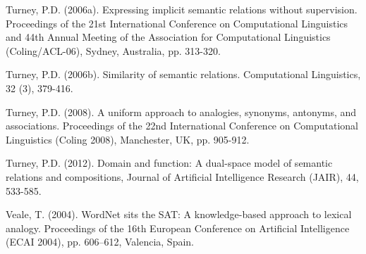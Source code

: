 \documentclass[11pt]{article}
\begin{document}
Turney, P.D. (2006a). Expressing implicit semantic relations without supervision. Proceedings of the 21st International Conference on Computational Linguistics and 44th Annual Meeting of the Association for Computational Linguistics (Coling/ACL-06), Sydney, Australia, pp. 313-320.

Turney, P.D. (2006b). Similarity of semantic relations. Computational Linguistics, 32 (3), 379-416.

Turney, P.D. (2008). A uniform approach to analogies, synonyms, antonyms, and associations. Proceedings of the 22nd International Conference on Computational Linguistics (Coling 2008), Manchester, UK, pp. 905-912.

Turney, P.D. (2012). Domain and function: A dual-space model of semantic relations and compositions, Journal of Artificial Intelligence Research (JAIR), 44, 533-585.

Veale, T. (2004). WordNet sits the SAT: A knowledge-based approach to lexical analogy. Proceedings of the 16th European Conference on Artificial Intelligence (ECAI 2004), pp. 606–612, Valencia, Spain.
\end{document}
